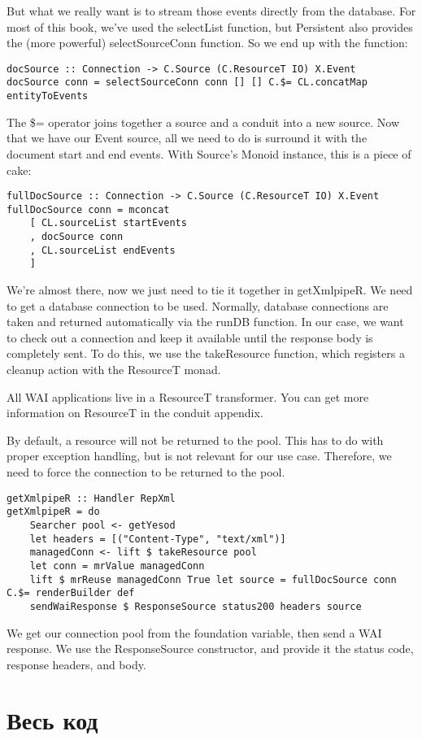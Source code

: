 But what we really want is to stream those events directly from the database. For most of this book, we've used the selectList function, but Persistent also provides the (more powerful) selectSourceConn function. So we end up with the function:

\begin{lstlisting}
docSource :: Connection -> C.Source (C.ResourceT IO) X.Event
docSource conn = selectSourceConn conn [] [] C.$= CL.concatMap entityToEvents
\end{lstlisting}%

The \$= operator joins together a source and a conduit into a new source. Now that we have our Event source, all we need to do is surround it with the document start and end events. With Source's Monoid instance, this is a piece of cake:

\begin{lstlisting}
fullDocSource :: Connection -> C.Source (C.ResourceT IO) X.Event
fullDocSource conn = mconcat
    [ CL.sourceList startEvents
    , docSource conn
    , CL.sourceList endEvents
    ]
\end{lstlisting}

We're almost there, now we just need to tie it together in getXmlpipeR. We need to get a database connection to be used. Normally, database connections are taken and returned automatically via the runDB function. In our case, we want to check out a connection and keep it available until the response body is completely sent. To do this, we use the takeResource function, which registers a cleanup action with the ResourceT monad.

All WAI applications live in a ResourceT transformer. You can get more information on ResourceT in the conduit appendix.

By default, a resource will not be returned to the pool. This has to do with proper exception handling, but is not relevant for our use case. Therefore, we need to force the connection to be returned to the pool.

\begin{lstlisting}
getXmlpipeR :: Handler RepXml
getXmlpipeR = do
    Searcher pool <- getYesod
    let headers = [("Content-Type", "text/xml")]
    managedConn <- lift $ takeResource pool
    let conn = mrValue managedConn
    lift $ mrReuse managedConn True let source = fullDocSource conn C.$= renderBuilder def
    sendWaiResponse $ ResponseSource status200 headers source
\end{lstlisting}

We get our connection pool from the foundation variable, then send a WAI response. We use the ResponseSource constructor, and provide it the status code, response headers, and body.

\section{Весь код} %


